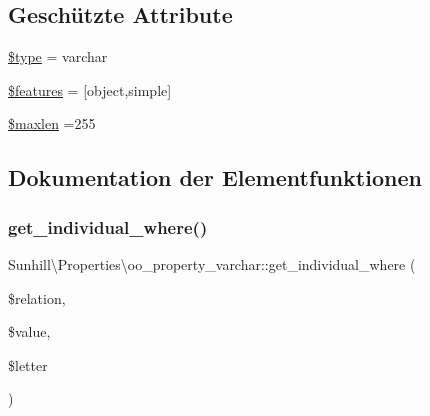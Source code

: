 \subsection*{Geschützte Attribute}
\begin{DoxyCompactItemize}
\item 
\hyperlink{classSunhill_1_1Properties_1_1oo__property__varchar_a595358bf255c980453eb7dca0a648252}{\$type} = \textquotesingle{}varchar\textquotesingle{}
\item 
\hyperlink{classSunhill_1_1Properties_1_1oo__property__varchar_a9d32ef02f7b436bda91f724a64f21743}{\$features} = \mbox{[}\textquotesingle{}object\textquotesingle{},\textquotesingle{}simple\textquotesingle{}\mbox{]}
\item 
\hyperlink{classSunhill_1_1Properties_1_1oo__property__varchar_a96e37cca92a0428636bef8cfe5c53ac6}{\$maxlen} =255
\end{DoxyCompactItemize}


\subsection{Dokumentation der Elementfunktionen}
\mbox{\label{classSunhill_1_1Properties_1_1oo__property__varchar_aadc6b3ed28c801c37d838b0a3b2005a5}} 
\subsubsection{\texorpdfstring{get\+\_\+individual\+\_\+where()}{get\_individual\_where()}}
{\footnotesize\ttfamily Sunhill\textbackslash{}\+Properties\textbackslash{}oo\+\_\+property\+\_\+varchar\+::get\+\_\+individual\+\_\+where (\begin{DoxyParamCaption}\item[{}]{\$relation,  }\item[{}]{\$value,  }\item[{}]{\$letter }\end{DoxyParamCaption})\hspace{0.3cm}{\ttfamily [protected]}}

\mbox{\label{classSunhill_1_1Properties_1_1oo__property__varchar_a596f5e65a1d3e8f3b72768ebb6048c9d}} 
